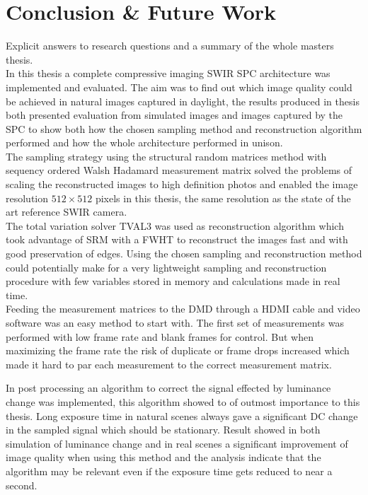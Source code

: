 \section{Conclusion \& Future Work}
Explicit answers to research questions and a summary of the whole masters thesis.\\[0.1in]

In this thesis a complete compressive imaging SWIR SPC architecture was implemented and evaluated. The aim was to find out which image quality could be achieved in natural images captured in daylight, the results produced in thesis both presented evaluation from simulated images and images captured by the SPC to show both how the chosen sampling method and reconstruction algorithm performed and how the whole architecture performed in unison.\\[0.1in]

The sampling strategy using the structural random matrices method with sequency ordered Walsh Hadamard measurement matrix solved the problems of scaling the reconstructed images to high definition photos and enabled the image resolution $512 \times 512$ pixels in this thesis, the same resolution as the state of the art reference SWIR camera.\\[0.1in]

The total variation solver TVAL3 was used as reconstruction algorithm  which took advantage of SRM with a FWHT to reconstruct the images fast and with good preservation of edges. Using the chosen sampling and reconstruction method could potentially make for a very lightweight sampling and reconstruction procedure with few variables stored in memory and calculations made in real time.\\[0.1in]

Feeding the measurement matrices to the DMD through a HDMI cable and video software was an easy method to start with. The first set of measurements was performed with low frame rate and blank frames for control. But when maximizing the frame rate the risk of duplicate or frame drops increased which made it hard to par each measurement to the correct measurement matrix. 

In post processing an algorithm to correct the signal effected by luminance change was implemented, this algorithm showed to of outmost importance to this thesis. Long exposure time in natural scenes always gave a significant DC change in the sampled signal which should be stationary. Result showed in both simulation of luminance change and in real scenes a significant improvement of image quality when using this method and the analysis indicate that the algorithm may be relevant even if the exposure time gets reduced to near a second.\\[0.1in]


